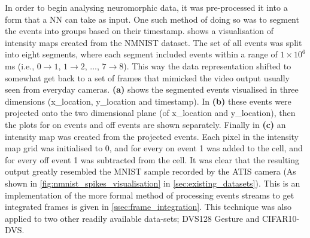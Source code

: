 In order to begin analysing neuromorphic data, it was pre-processed it into a form that a NN can take as input. One such method of doing so was to segment the events into groups based on their timestamp.  shows a visualisation of intensity maps created from the NMNIST\cite{NMNIST} dataset. The set of all events was split into eight segments, where each segment included events within a range of $ 1 \times 10^6 $ ms (i.e., $ 0 \rightarrow 1 $, $ 1 \rightarrow 2 $, ..., $ 7 \rightarrow 8 $). This way the data representation shifted to somewhat get back to a set of frames that mimicked the video output usually seen from everyday cameras. \textbf{(a)} shows the segmented events visualised in three dimensions (x\_location, y\_location and timestamp). In \textbf{(b)} these events were projected onto the two dimensional plane (of x\_location and y\_location), then the plots for on events and off events are shown separately. Finally in \textbf{(c)} an intensity map was created from the projected events. Each pixel in the intensity map grid was initialised to 0, and for every on event 1 was added to the cell, and for every off event 1 was subtracted from the cell. It was clear that the resulting output greatly resembled the MNIST\cite{MNIST} sample recorded by the ATIS camera (As shown in \cref{fig:nmnist_spikes_visualisation} in \cref{sec:existing_datasets}). This is an implementation of the more formal method of processing events streams to get integrated frames is given in \cref{ssec:frame_integration}. This technique was also applied to two other readily available data-sets; DVS128 Gesture and CIFAR10-DVS.

